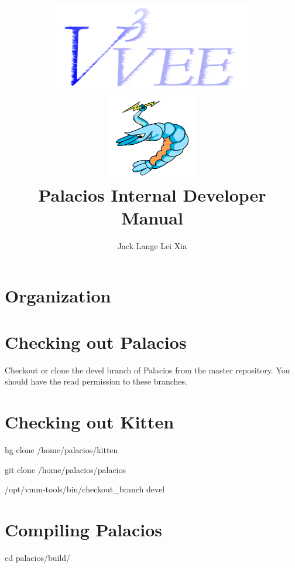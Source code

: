 \documentclass[11pt]{article}
\begin{document}
\title{
\includegraphics[height=1.5in]{v3vee.pdf}
\includegraphics[height=1.5in]{palacios.pdf} \\
\vspace{0.5in} 
Palacios Internal Developer Manual
}
\author{Jack Lange \hspace{0.5in} Lei Xia}

\maketitle


\section{Organization}


\section{Checking out Palacios}

Checkout or clone the devel branch of Palacios from the master
repository. You should have the read permission to these branches.


\section{Checking out Kitten}

hg clone /home/palacios/kitten

git clone /home/palacios/palacios

/opt/vmm-tools/bin/checkout\_branch devel


\section{Compiling Palacios}
cd palacios/build/
\end{document}

